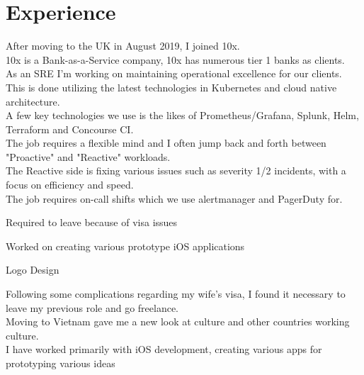 \documentclass[]{cv}
\begin{document}
\begin{minipage}[t]{0.66\textwidth} 

\section{Experience}


After moving to the UK in August 2019, I joined 10x. \\
10x is a Bank-as-a-Service company, 10x has numerous tier 1 banks as clients. \\
As an SRE I'm working on maintaining operational excellence for our clients. \\
This is done utilizing the latest technologies in Kubernetes and cloud native architecture. \\
A few key technologies we use is the likes of Prometheus/Grafana, Splunk, Helm, Terraform and Concourse CI. \\
The job requires a flexible mind and I often jump back and forth between "Proactive" and "Reactive" workloads. \\
The Reactive side is fixing various issues such as severity 1/2 incidents, with a focus on efficiency and speed. \\
The job requires on-call shifts which we use alertmanager and PagerDuty for. \\

\vspace{\topsep} %
\begin{tightemize}
	\item Required to leave because of visa issues
	\item Worked on creating various prototype iOS applications
	\item Logo Design
\end{tightemize}
\sectionsep

\descript{}

Following some complications regarding my wife’s visa, I found it necessary to leave my previous role and go freelance. \\
Moving to Vietnam gave me a new look at culture and other countries working culture. \\
I have worked primarily with iOS development, creating various apps for prototyping various ideas \\


\end{minipage}
\end{document}
